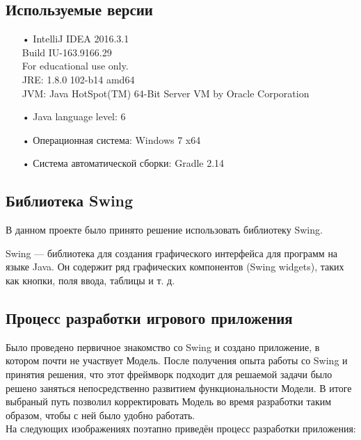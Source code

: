 \subsection{Используемые версии}

\begin{enumerate}
\item[•]  IntelliJ IDEA 2016.3.1\\
Build IU-163.9166.29\\
For educational use only.\\
JRE: 1.8.0 102-b14 amd64\\
JVM: Java HotSpot(TM) 64-Bit Server VM by Oracle Corporation\\
\item[•]  Java language level: 6
\item[•]  Операционная система: Windows 7 x64
\item[•]  Система автоматической сборки: Gradle 2.14
\end{enumerate}

\subsection{Библиотека Swing}

В данном проекте было принято решение использовать библиотеку Swing.

Swing — библиотека для создания графического интерфейса для программ на языке Java. Он содержит ряд графических компонентов (Swing widgets), таких как кнопки, поля ввода, таблицы и т. д.

\subsection{Процесс разработки игрового приложения}

Было проведено первичное знакомство со Swing и создано приложение, в котором почти не участвует Модель. После получения опыта работы со Swing и принятия решения, что этот фреймворк подходит для решаемой задачи было решено заняться непосредственно развитием функциональности Модели. В итоге выбраный путь позволил корректировать Модель во время разработки таким образом, чтобы с ней было удобно работать.\\

На следующих изображениях поэтапно приведён процесс разработки приложения:

